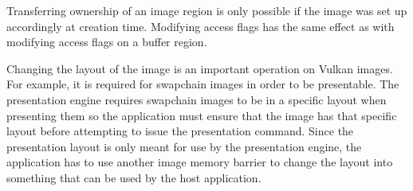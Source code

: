         Transferring ownership of an image region is only possible if the image was set up accordingly at creation time. Modifying access flags has the same effect as with modifying access flags on a buffer region.

        Changing the layout of the image is an important operation on Vulkan images. For example, it is required for swapchain images in order to be presentable. The presentation engine requires swapchain images to be in a specific layout when presenting them so the \gls{application} must ensure that the image has that specific layout before attempting to issue the presentation command. Since the presentation layout is only meant for use by the presentation engine, the \gls{application} has to use another image memory barrier to change the layout into something that can be used by the \gls{host} \gls{application}.
